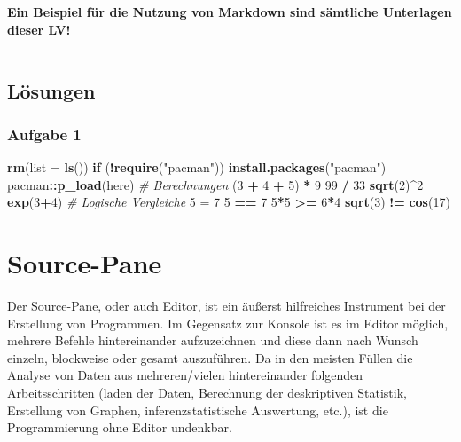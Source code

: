 \documentclass[]{article}
\newenvironment{Shaded}{\begin{snugshade}}{\end{snugshade}}
\newcommand{\KeywordTok}[1]{\textcolor[rgb]{0.13,0.29,0.53}{\textbf{#1}}}
\newcommand{\DataTypeTok}[1]{\textcolor[rgb]{0.13,0.29,0.53}{#1}}
\newcommand{\DecValTok}[1]{\textcolor[rgb]{0.00,0.00,0.81}{#1}}
\newcommand{\StringTok}[1]{\textcolor[rgb]{0.31,0.60,0.02}{#1}}
\newcommand{\CommentTok}[1]{\textcolor[rgb]{0.56,0.35,0.01}{\textit{#1}}}
\newcommand{\ControlFlowTok}[1]{\textcolor[rgb]{0.13,0.29,0.53}{\textbf{#1}}}
\newcommand{\OperatorTok}[1]{\textcolor[rgb]{0.81,0.36,0.00}{\textbf{#1}}}
\newcommand{\NormalTok}[1]{#1}
\begin{document}
\textbf{Ein Beispiel für die Nutzung von Markdown sind sämtliche
Unterlagen dieser LV!}

\begin{center}\rule{0.5\linewidth}{\linethickness}\end{center}

\subsection*{Lösungen}\label{losungen}

\hypertarget{aufgabe-1}{\subsubsection*{Aufgabe 1}\label{aufgabe-1}}

\begin{Shaded}
\begin{Highlighting}[]
\KeywordTok{rm}\NormalTok{(}\DataTypeTok{list =} \KeywordTok{ls}\NormalTok{())}
\ControlFlowTok{if}\NormalTok{ (}\OperatorTok{!}\KeywordTok{require}\NormalTok{(}\StringTok{"pacman"}\NormalTok{)) }\KeywordTok{install.packages}\NormalTok{(}\StringTok{"pacman"}\NormalTok{)}
\NormalTok{pacman}\OperatorTok{::}\KeywordTok{p_load}\NormalTok{(here)}
\CommentTok{# Berechnungen}
\NormalTok{(}\DecValTok{3} \OperatorTok{+}\StringTok{ }\DecValTok{4} \OperatorTok{+}\StringTok{ }\DecValTok{5}\NormalTok{) }\OperatorTok{*}\StringTok{ }\DecValTok{9}
\DecValTok{99} \OperatorTok{/}\StringTok{ }\DecValTok{33}
\KeywordTok{sqrt}\NormalTok{(}\DecValTok{2}\NormalTok{)}\OperatorTok{^}\DecValTok{2}
\KeywordTok{exp}\NormalTok{(}\DecValTok{3}\OperatorTok{+}\DecValTok{4}\NormalTok{)}
\CommentTok{# Logische Vergleiche}
\DecValTok{5}\NormalTok{ =}\StringTok{ }\DecValTok{7}
\DecValTok{5} \OperatorTok{==}\StringTok{ }\DecValTok{7}
\DecValTok{5}\OperatorTok{*}\DecValTok{5} \OperatorTok{>=}\StringTok{ }\DecValTok{6}\OperatorTok{*}\DecValTok{4}
\KeywordTok{sqrt}\NormalTok{(}\DecValTok{3}\NormalTok{) }\OperatorTok{!=}\StringTok{ }\KeywordTok{cos}\NormalTok{(}\DecValTok{17}\NormalTok{)}
\end{Highlighting}
\end{Shaded}

\section{Source-Pane}\label{source-pane}

Der Source-Pane, oder auch Editor, ist ein äußerst hilfreiches
Instrument bei der Erstellung von Programmen. Im Gegensatz zur Konsole
ist es im Editor möglich, mehrere Befehle hintereinander aufzuzeichnen
und diese dann nach Wunsch einzeln, blockweise oder gesamt auszuführen.
Da in den meisten Füllen die Analyse von Daten aus mehreren/vielen
hintereinander folgenden Arbeitsschritten (laden der Daten, Berechnung
der deskriptiven Statistik, Erstellung von Graphen, inferenzstatistische
Auswertung, etc.), ist die Programmierung ohne Editor undenkbar.
\end{document}
